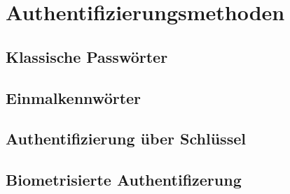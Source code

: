 \section{Authentifizierungsmethoden}
\subsection{Klassische Passwörter}
\subsection{Einmalkennwörter}
\subsection{Authentifizierung über Schlüssel}
\subsection{Biometrisierte Authentifizerung}

